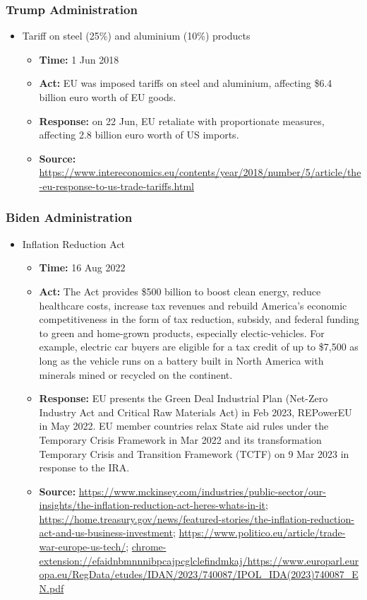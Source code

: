 		\subsubsection{Trump Administration}
			\begin{itemize}
			\item	Tariff on steel (25\%) and aluminium (10\%) products
				\begin{itemize}
				\item \textbf{Time: }1 Jun 2018
				\item \textbf{Act: } EU was imposed tariffs on steel and aluminium, affecting \$6.4 billion euro worth of EU goods.
				\item \textbf{Response: } on 22 Jun, EU retaliate with proportionate measures, affecting 2.8 billion euro worth of US imports.
				\item	\textbf{Source: } \url{https://www.intereconomics.eu/contents/year/2018/number/5/article/the-eu-response-to-us-trade-tariffs.html}
				\end{itemize}
			\end{itemize}
			
		\subsubsection{Biden Administration}
			\begin{itemize}
			\item Inflation Reduction Act
				\begin{itemize}
				\item \textbf{Time: } 16 Aug 2022
				\item \textbf{Act: } The Act provides \$500 billion to boost clean energy, reduce healthcare costs, increase tax revenues and rebuild America's economic competitiveness in the form of tax reduction, subsidy, and federal funding to green and home-grown products, especially electic-vehicles. For example, electric car buyers are eligible for a tax credit of up to \$7,500 as long as the vehicle runs on a battery built in North America with minerals mined or recycled on the continent.
				\item \textbf{Response: } EU presents the Green Deal Industrial Plan (Net-Zero Industry Act and Critical Raw Materials Act) in Feb 2023, REPowerEU in May 2022. EU member countries relax State aid rules under the Temporary Crisis Framework in Mar 2022 and its transformation Temporary Crisis and Transition Framework (TCTF) on 9 Mar 2023 in response to the IRA.
				\item	\textbf{Source: }\url{https://www.mckinsey.com/industries/public-sector/our-insights/the-inflation-reduction-act-heres-whats-in-it}; \url{https://home.treasury.gov/news/featured-stories/the-inflation-reduction-act-and-us-business-investment}; \url{https://www.politico.eu/article/trade-war-europe-us-tech/}; \url{chrome-extension://efaidnbmnnnibpcajpcglclefindmkaj/https://www.europarl.europa.eu/RegData/etudes/IDAN/2023/740087/IPOL_IDA(2023)740087_EN.pdf}
				\end{itemize}
			\end{itemize}
			
